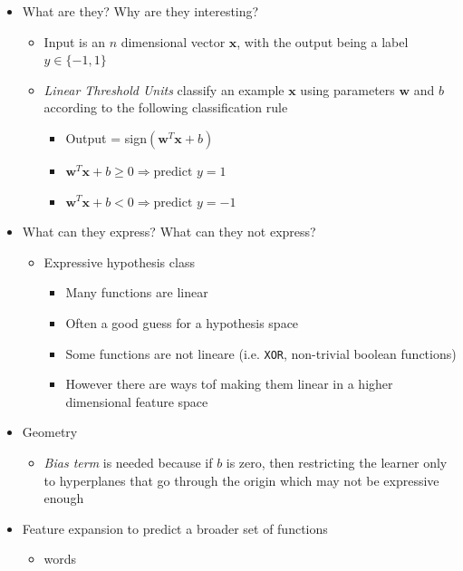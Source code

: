 \documentclass{article}
\begin{document}
\hspace{-1.5em}{\large \bf Linear Classifiers}
\begin{itemize}
\item What are they? Why are they interesting?
	\begin{itemize}
	\item Input is an $n$ dimensional vector $\mathbf{x}$, with the output being a label $y\in \{-1,1\}$
	\item {\em Linear Threshold Units} classify an example $\mathbf{x}$ using parameters $\mathbf{w}$ and $b$ according to the following classification rule
		\begin{itemize}
		\item Output = sign$(\mathbf{w}^{T}\mathbf{x} + b)$
		\item $\mathbf{w}^{T}\mathbf{x} + b \geq 0 \Rightarrow \text{predict } y = 1$
		\item $\mathbf{w}^{T}\mathbf{x} + b < 0 \Rightarrow \text{predict } y = -1$
		\end{itemize}
	\end{itemize}
\item What can they express? What can they not express?
	\begin{itemize}
	\item Expressive hypothesis class
		\begin{itemize}
		\item Many functions are linear
		\item Often a good guess for a hypothesis space
		\item Some functions are not lineare (i.e. \verb~XOR~, non-trivial boolean functions)
		\item However there are ways tof making them linear in a higher dimensional feature space
		\end{itemize}
	\end{itemize}
\item Geometry
	\begin{itemize}
	\item {\em Bias term} is needed because if $b$ is zero, then restricting the learner only to hyperplanes that go through the origin which may not be expressive enough
	\end{itemize}
\item Feature expansion to predict a broader set of functions
	\begin{itemize}
	\item words
	\end{itemize}
\end{itemize}
\end{document}
